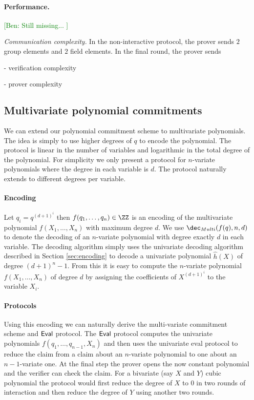 \documentclass{article}
\theoremstyle{definition}
\newcommand{\ben}[1]{{\textcolor{green}{[Ben: #1]}}}
\newcommand{\ben}[1]{}
\begin{document}
\paragraph{Performance.} 
\ben{Still missing... } 

\textit{Communication complexity.} In the non-interactive protocol, the prover sends $2$ group elements and $2$ field elements. In the final round, the prover sends 
 
 - verification complexity 
 
 - prover complexity

\subsection{Multivariate polynomial commitments}\label{sec:multivariate}

We can extend our polynomial commitment scheme to multivariate polynomials. The idea is simply to use higher degrees of $q$ to encode the polynomial. The protocol is linear in the number of variables and logarithmic in the total degree of the polynomial. For simplicity we only present a protocol for $n$-variate polynomials where the degree in each variable is $d$. The protocol naturally extends to different degrees per variable.
\paragraph{Encoding}
Let $q_i=q^{(d+1)^i}$ then $f(q_1,\dots,q_n)\in \ZZ$ is an encoding of the multivariate polynomial $f(X_1,\dots,X_n)$ with maximum degree $d$. We use $\dec_{Multi}(f(q),n,d)$ to denote the decoding of an $n$-variate polynomial with degree exactly $d$ in each variable. The decoding algorithm simply uses the univariate decoding algorithm described in Section \ref{sec:encoding} to decode a univariate polynomial $\hat{h}(X)$ of degree $(d+1)^n-1$. From this it is easy to compute the $n$-variate polynomial $f(X_1,\dots,X_n)$ of degree $d$ by assigning the coefficients of $X^{(d+1)^i}$ to the variable $X_i$.
\paragraph{Protocols}
 Using this encoding we can naturally derive the multi-variate commitment scheme and $\textsf{{Eval}}$ protocol. The $\textsf{{Eval}}$ protocol computes the univariate polynomials $f(q_1,\dots,q_{n-1},X_n)$ and then uses the univariate eval protocol to reduce the claim from a claim about an $n$-variate polynomial to one about an $n-1$-variate one. At the final step the prover opens the now constant polynomial and the verifier can check the claim. For a bivariate (say $X$ and $Y$) cubic polynomial the protocol would first reduce the degree of $X$ to $0$ in two rounds of interaction and then reduce the degree of $Y$ using another two rounds.
 
\end{document}
